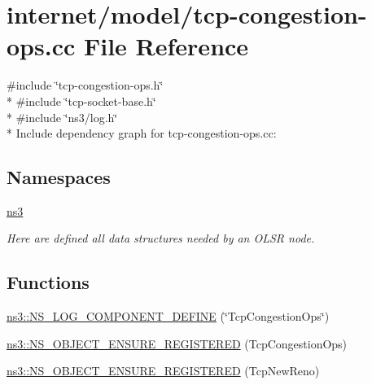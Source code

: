 \hypertarget{tcp-congestion-ops_8cc}{}\section{internet/model/tcp-\/congestion-\/ops.cc File Reference}
\label{tcp-congestion-ops_8cc}
{\ttfamily \#include \char`\"{}tcp-\/congestion-\/ops.\+h\char`\"{}}\\*
{\ttfamily \#include \char`\"{}tcp-\/socket-\/base.\+h\char`\"{}}\\*
{\ttfamily \#include \char`\"{}ns3/log.\+h\char`\"{}}\\*
Include dependency graph for tcp-\/congestion-\/ops.cc\+:
\subsection*{Namespaces}
\begin{DoxyCompactItemize}
\item 
 \hyperlink{namespacens3}{ns3}
\begin{DoxyCompactList}\small\item\em Here are defined all data structures needed by an O\+L\+SR node. \end{DoxyCompactList}\end{DoxyCompactItemize}
\subsection*{Functions}
\begin{DoxyCompactItemize}
\item 
\hyperlink{namespacens3_a180a5bb0c9ecfcf92f742580e1e02fcf}{ns3\+::\+N\+S\+\_\+\+L\+O\+G\+\_\+\+C\+O\+M\+P\+O\+N\+E\+N\+T\+\_\+\+D\+E\+F\+I\+NE} (\char`\"{}Tcp\+Congestion\+Ops\char`\"{})
\item 
\hyperlink{namespacens3_a0adfc2447922fda3e4f8c04c8041f01e}{ns3\+::\+N\+S\+\_\+\+O\+B\+J\+E\+C\+T\+\_\+\+E\+N\+S\+U\+R\+E\+\_\+\+R\+E\+G\+I\+S\+T\+E\+R\+ED} (Tcp\+Congestion\+Ops)
\item 
\hyperlink{namespacens3_aff6d77c2ff557b6fe6e5e1fa1b605997}{ns3\+::\+N\+S\+\_\+\+O\+B\+J\+E\+C\+T\+\_\+\+E\+N\+S\+U\+R\+E\+\_\+\+R\+E\+G\+I\+S\+T\+E\+R\+ED} (Tcp\+New\+Reno)
\end{DoxyCompactItemize}
